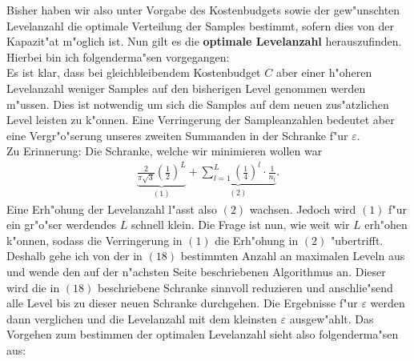 Bisher haben wir also unter Vorgabe des Kostenbudgets sowie der gew"unschten Levelanzahl die optimale Verteilung der Samples bestimmt, sofern dies von der Kapazit"at m"oglich ist.
Nun gilt es die \textbf{optimale Levelanzahl} herauszufinden.\\
Hierbei bin ich folgenderma"sen vorgegangen:\\
Es ist klar, dass bei gleichbleibendem Kostenbudget $C$ aber einer h"oheren Levelanzahl weniger Samples auf den bisherigen Level genommen werden m"ussen. Dies ist notwendig um sich die Samples auf dem neuen zus"atzlichen Level leisten zu k"onnen. Eine Verringerung der Sampleanzahlen bedeutet aber eine Vergr"o"serung unseres zweiten Summanden in der Schranke f"ur $\varepsilon$. \\
Zu Erinnerung: Die Schranke, welche wir minimieren wollen war
\begin{align*}
\underbrace{\frac{2}{\pi\sqrt{3}}\left(\frac{1}{2}\right)^L}_{(1)}+ \underbrace{\sum_{l=1}^L\left(\frac{1}{4}\right)^l\cdot\frac{1}{n_l}}_{(2)}.
\end{align*}
Eine Erh"ohung der Levelanzahl l"asst also $(2)$ wachsen. Jedoch wird $(1)$ f"ur ein gr"o"ser werdendes $L$ schnell klein. Die Frage ist nun, wie weit wir $L$ erh"ohen k"onnen, sodass die Verringerung in $(1)$ die Erh"ohung in $(2)$ "ubertrifft.
Deshalb gehe ich von der in $(18)$ bestimmten Anzahl an maximalen Leveln aus und wende den auf der n"achsten Seite beschriebenen Algorithmus an.
Dieser wird die in $(18)$ beschriebene Schranke sinnvoll reduzieren und anschlie"send alle Level bis zu dieser  neuen Schranke durchgehen. Die Ergebnisse f"ur $\varepsilon$ werden dann verglichen  und die Levelanzahl mit dem kleinsten $\varepsilon$ ausgew"ahlt.\newpage 
Das Vorgehen zum bestimmen der optimalen Levelanzahl sieht also folgenderma"sen aus:\\

